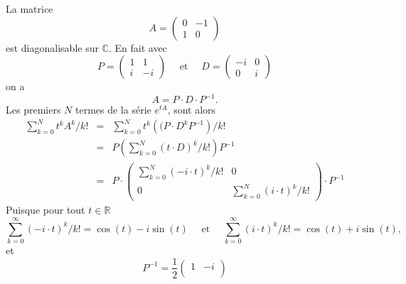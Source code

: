 \begin{example} 
  La matrice
  \begin{displaymath}
    A =
    \begin{pmatrix}
      0 & -1 \\
      1 & 0
    \end{pmatrix} 
  \end{displaymath}
  est diagonalisable sur $ℂ$.  En fait avec
  \begin{displaymath}
    P =  \left(\begin{array}{rr}
                 1 & 1 \\
                  i & - i
               \end{array}\right) \quad \text{ et }  \quad
             D = \left(\begin{array}{rr}
                         - i & 0 \\
                         0 &  i
                       \end{array}\right)
  \end{displaymath}
  on a 
  \begin{displaymath}
    A =
    P ⋅ D ⋅ P^{-1}.      
  \end{displaymath}
  Les premiers $N$ termes de la série $e^{tA}$, sont  alors
  \begin{eqnarray*}
    ∑_{k=0}^N t^k A^k / k!  & = & ∑_{k=0}^N t^k \left((P ⋅ D^k P^{-1}\right)/ k!   \\
                       & = & P  \left( ∑_{k=0}^N (t⋅ D)^k/ k!  \right)P^{-1}  \\
                       & =  & P ⋅
                            \begin{pmatrix}
                              \displaystyle ∑_{k=0}^N (-i ⋅t)^k/ k!   & 0 \\
                              0 &  \displaystyle ∑_{k=0}^N (i ⋅t)^k / k! 
                            \end{pmatrix} ⋅P^{-1}
  \end{eqnarray*}
  Puisque pour tout $t ∈ ℝ$ 
  \begin{displaymath}
    ∑_{k=0}^∞ (- i ⋅ t )^k/ k!  =  \cos(t) - i \sin(t)  \quad  \text{ et } \quad  ∑_{k=0}^∞ ( i ⋅ t )^k  / k! =   \cos(t) + i \sin(t),
  \end{displaymath}
et 
  \begin{displaymath}
    P^{-1}  = \frac{1}{2}
    \begin{pmatrix}
      1 & - i \\

\end{pmatrix}
\end{displaymath}
\end{example}
